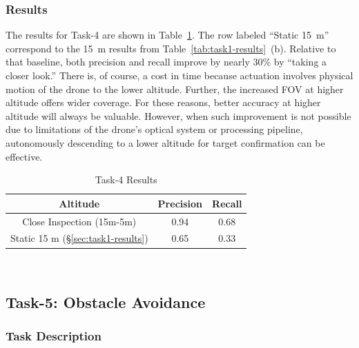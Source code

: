 \subsubsection{Results}
\label{sec:task4-results}

The results for Task-4 are shown in Table~\ref{tab:task4-results}.
The row labeled ``Static 15~m'' correspond to the 15~m results from
Table~\ref{tab:task1-results}~(b).  Relative to that baseline, both
precision and recall improve by nearly 30\% by ``taking a closer
look.''  There is, of course, a cost in time because actuation
involves physical motion of the drone to the lower altitude.  Further,
the increased FOV at higher altitude offers wider coverage.  For these
reasons, better accuracy at higher altitude will always be valuable.
However, when such improvement is not possible due to limitations of
the drone's optical system or processing pipeline, autonomously
descending to a lower altitude for target confirmation can be
effective.

\begin{table}
	\centering\small
		\centering\small
			\begin{tabular}{|c|c|c|}
			\hline
			Altitude& Precision & Recall\\
			\hline
			Close Inspection (15m-5m) & 0.94 & 0.68 \\
			Static 15 m (\S\ref{sec:task1-results}) & 0.65 & 0.33 \\
			\hline
		\end{tabular}\\
		\caption{Task-4 Results}
		\label{tab:task4-results}
\end{table}

\subsection{Task-5: Obstacle Avoidance}
\label{sec:task5}

\subsubsection{Task Description}
\label{sec:task5-desc}

